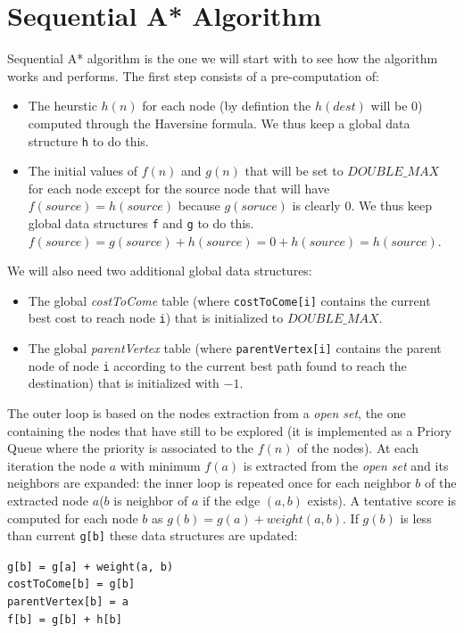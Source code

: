 \documentclass[twocolumn, switch]{article} %
\begin{document}
\section{Sequential A* Algorithm}
Sequential A* algorithm is the one we will start with to see how the algorithm works and performs.
The first step consists of a pre-computation of:
\begin{itemize}
  \item The heurstic $h(n)$ for each node (by defintion the $h(dest)$ will
        be 0) computed through the Haversine formula. We thus keep a global data
        structure \texttt{h} to do this.
  \item The initial values of $f(n)$ and $g(n)$ that will be set to $DOUBLE\_MAX$ for each
        node except for the source node that will have $f(source) = h(source)$ because 
        $g(soruce)$ is clearly $0$. We thus keep global data structures \texttt{f} and \texttt{g} to do this. 
        $f(source) = g(source) + h(source) = 0 + h(source) = h(source)$.
\end{itemize}
We will also need two additional global data structures:
\begin{itemize}
  \item The global \textit{costToCome} table (where \texttt{costToCome[i]} contains the current
        best cost to reach node \texttt{i}) that is initialized
        to $DOUBLE\_MAX$.
  \item The global \textit{parentVertex} table (where \texttt{parentVertex[i]} contains the
        parent node of node \texttt{i} according to the current best path found to reach
        the destination) that is initialized with $-1$.
\end{itemize}
The outer loop is based on the nodes extraction from a \textit{open set}, the one containing
the nodes that have still to be explored (it is implemented as a Priory Queue where the priority
is associated to the $f(n)$ of the nodes). At each iteration the node $a$ with minimum $f(a)$ is
extracted from the \textit{open set} and its neighbors are expanded: the inner loop is repeated once for each neighbor $b$ of the
extracted node $a$($b$ is neighbor of $a$ if the edge $(a, b)$ exists). A tentative score is computed
for each node $b$ as $g(b) = g(a) + weight(a, b)$. If $g(b)$ is less than current \texttt{g[b]} these data structures
are updated: 
\begin{flushleft}
  \texttt{g[b] = g[a] + weight(a, b)}\\
  \texttt{costToCome[b] = g[b]}\\
  \texttt{parentVertex[b] = a}\\
  \texttt{f[b] = g[b] + h[b]}
\end{flushleft}
\end{document}
